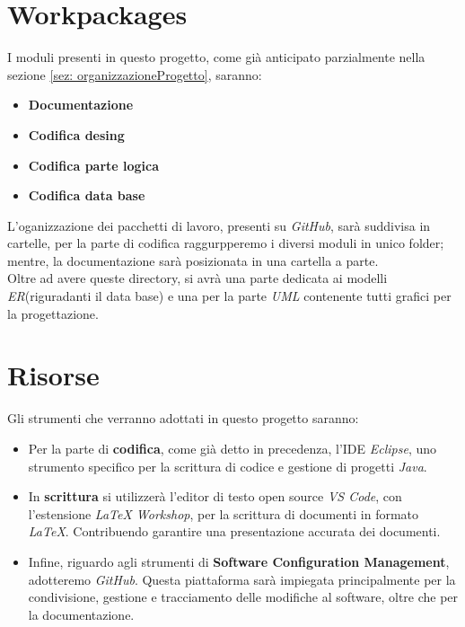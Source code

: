 \documentclass{book}
\begin{document}
\section{Workpackages}

I moduli presenti in questo progetto, come già anticipato parzialmente nella sezione \ref{sez: organizzazioneProgetto}, saranno:
\begin{itemize}
    \item \textbf{Documentazione}
    \item \textbf{Codifica desing}
    \item \textbf{Codifica parte logica}
    \item \textbf{Codifica data base}
\end{itemize}

L'oganizzazione dei pacchetti di lavoro, presenti su \textit{GitHub}, sarà suddivisa in cartelle, per la parte di codifica raggurpperemo i diversi moduli in unico folder; mentre, la documentazione sarà posizionata in una cartella a parte.\\

Oltre ad avere queste directory, si avrà una parte dedicata ai modelli \textit{ER}(riguradanti il data base) e una per la parte \textit{UML} contenente tutti grafici per la progettazione. 

\section{Risorse}

Gli strumenti che verranno adottati in questo progetto saranno:
\begin{itemize}
    \item Per la parte di \textbf{codifica}, come già detto in precedenza, l'IDE \textit{Eclipse}, uno strumento specifico per la scrittura di codice e gestione di progetti \textit{Java}.
    \item In \textbf{scrittura} si utilizzerà l'editor di testo open source \textit{VS Code}, con l'estensione \textit{LaTeX Workshop}, per la scrittura di documenti in formato \textit{LaTeX}. Contribuendo garantire una presentazione accurata dei documenti.
    \item Infine, riguardo agli strumenti di \textbf{Software Configuration Management}, adotteremo \textit{GitHub}. Questa piattaforma sarà impiegata principalmente per la condivisione, gestione e tracciamento delle modifiche al software, oltre che per la documentazione. 

\end{itemize}
\end{document}
